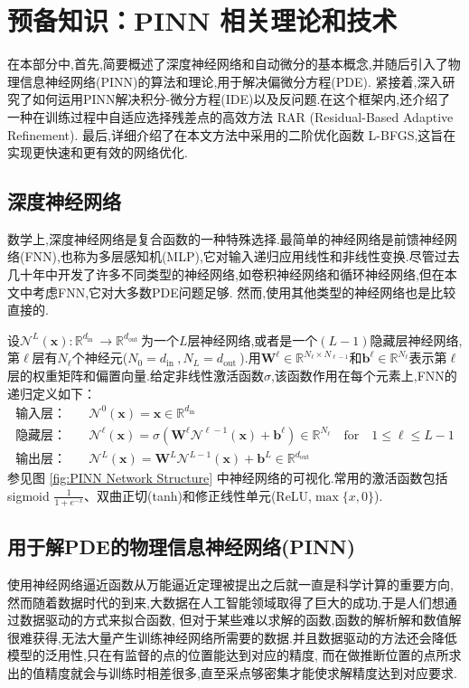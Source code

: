 \documentclass{Sichuan Normal University}
\begin{document}
\section{预备知识：PINN 相关理论和技术}
在本部分中,首先,简要概述了深度神经网络和自动微分的基本概念,并随后引入了物理信息神经网络(PINN)的算法和理论,用于解决偏微分方程(PDE).
紧接着,深入研究了如何运用PINN解决积分-微分方程(IDE)以及反问题.在这个框架内,还介绍了一种在训练过程中自适应选择残差点的高效方法 RAR (Residual-Based Adaptive Refinement).
最后,详细介绍了在本文方法中采用的二阶优化函数 L-BFGS,这旨在实现更快速和更有效的网络优化.
\subsection{深度神经网络}
数学上,深度神经网络是复合函数的一种特殊选择.最简单的神经网络是前馈神经网络(FNN),也称为多层感知机(MLP),它对输入递归应用线性和非线性变换.尽管过去几十年中开发了许多不同类型的神经网络,如卷积神经网络和循环神经网络,但在本文中考虑FNN,它对大多数PDE问题足够.
然而,使用其他类型的神经网络也是比较直接的.

设$\mathcal{N}^L(\mathbf{x}): \mathbb{R}^{d_{\text {in }}} \rightarrow \mathbb{R}^{d_{\text {out }}}$为一个$L$层神经网络,或者是一个$(L-1)$隐藏层神经网络,第$\ell$层有$N_{\ell}$个神经元($N_0=d_{\text {in }}, N_L=d_{\text {out }}$).用$\boldsymbol{W}^{\ell} \in \mathbb{R}^{N_{\ell} \times N_{\ell-1}}$和$\mathbf{b}^{\ell} \in \mathbb{R}^{N_{\ell}}$表示第$\ell$层的权重矩阵和偏置向量.给定非线性激活函数$\sigma$,该函数作用在每个元素上,FNN的递归定义如下：
\begin{align}
\text{输入层：} & \quad \mathcal{N}^0(\mathbf{x})=\mathbf{x} \in \mathbb{R}^{d_{\text {in }}} \\
\text{隐藏层：} & \quad \mathcal{N}^{\ell}(\mathbf{x})=\sigma\left(\boldsymbol{W}^{\ell} \mathcal{N}^{\ell-1}(\mathbf{x})+\boldsymbol{b}^{\ell}\right) \in \mathbb{R}^{N_{\ell}} \quad \text{for} \quad 1 \leq \ell \leq L-1 \\
\text{输出层：} & \quad \mathcal{N}^L(\mathbf{x})=\boldsymbol{W}^L \mathcal{N}^{L-1}(\mathbf{x})+\boldsymbol{b}^L \in \mathbb{R}^{d_{\text {out }}}
\end{align}
参见图 \ref{fig:PINN Network Structure} 中神经网络的可视化.常用的激活函数包括 sigmoid $\frac{1}{1+e^{-x}}$、双曲正切(tanh)和修正线性单元(ReLU,$\max \{x, 0\}$).

\subsection{用于解PDE的物理信息神经网络(PINN)}
使用神经网络逼近函数从万能逼近定理被提出之后就一直是科学计算的重要方向,然而随着数据时代的到来,大数据在人工智能领域取得了巨大的成功,于是人们想通过数据驱动的方式来拟合函数,
但对于某些难以求解的函数,函数的解析解和数值解很难获得,无法大量产生训练神经网络所需要的数据.并且数据驱动的方法还会降低模型的泛用性,只在有监督的点的位置能达到对应的精度,
而在做推断位置的点所求出的值精度就会与训练时相差很多,直至采点够密集才能使求解精度达到对应要求.
\end{document}
